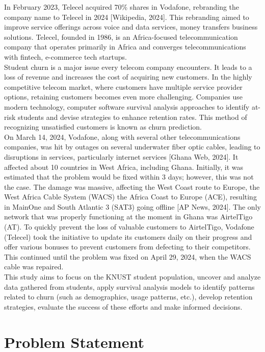 \documentclass[doublespacing,12pt]{report}
\begin{document}
In February 2023, Telecel acquired 70\% shares in Vodafone, rebranding the company name to Telecel in 2024 [Wikipedia, 2024]. This rebranding aimed to improve service offerings across voice and data services, money transfers business solutions. Telecel, founded in 1986, is an Africa-focused telecommunication company that operates primarily in Africa and converges telecommunications with fintech, e-commerce tech startups.\\
Student churn is a major issue every telecom company encounters. It leads to a loss of revenue and increases the cost of acquiring new customers. In the highly competitive telecom market, where customers have multiple service provider options, retaining customers becomes even more challenging. Companies use modern technology, computer software survival analysis approaches to identify at-risk students and devise strategies to enhance retention rates. This method of recognizing unsatisfied customers is known as churn prediction.\\
On March 14, 2024, Vodafone, along with several other telecommunications companies, was hit by outages on several underwater fiber optic cables, leading to disruptions in services, particularly internet services [Ghana Web, 2024]. It affected about 10 countries in West Africa, including Ghana. Initially, it was estimated that the problem would be fixed within 3 days; however, this was not the case. The damage was massive, affecting the West Coast route to Europe, the West Africa Cable System (WACS) the Africa Coast to Europe (ACE), resulting in MainOne and South Atlantic 3 (SAT3) going offline [AP News, 2024]. The only network that was properly functioning at the moment in Ghana was AirtelTigo (AT). To quickly prevent the loss of valuable customers to AirtelTigo, Vodafone (Telecel) took the initiative to update its customers daily on their progress and offer various bonuses to prevent customers from defecting to their competitors. This continued until the problem was fixed on April 29, 2024, when the WACS cable was repaired.\\
This study aims to focus on the KNUST student population, uncover and analyze data gathered from students, apply survival analysis models to identify patterns related to churn (such as demographics, usage patterns, etc.), develop retention strategies, evaluate the success of these efforts and make informed decisions.

\section{Problem Statement}
\end{document}
